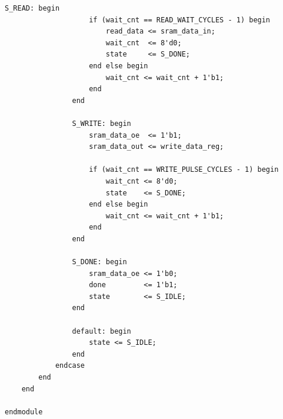 \documentclass[a4paper,10pt]{article}
\begin{document}
\begin{lstlisting}[caption=sram_ctrl.v]
                S_READ: begin
                    if (wait_cnt == READ_WAIT_CYCLES - 1) begin
                        read_data <= sram_data_in;
                        wait_cnt  <= 8'd0;
                        state     <= S_DONE;
                    end else begin
                        wait_cnt <= wait_cnt + 1'b1;
                    end
                end

                S_WRITE: begin
                    sram_data_oe  <= 1'b1;
                    sram_data_out <= write_data_reg;

                    if (wait_cnt == WRITE_PULSE_CYCLES - 1) begin
                        wait_cnt <= 8'd0;
                        state    <= S_DONE;
                    end else begin
                        wait_cnt <= wait_cnt + 1'b1;
                    end
                end

                S_DONE: begin
                    sram_data_oe <= 1'b0;
                    done         <= 1'b1;
                    state        <= S_IDLE;
                end

                default: begin
                    state <= S_IDLE;
                end
            endcase
        end
    end

endmodule

\end{lstlisting}
\end{document}
